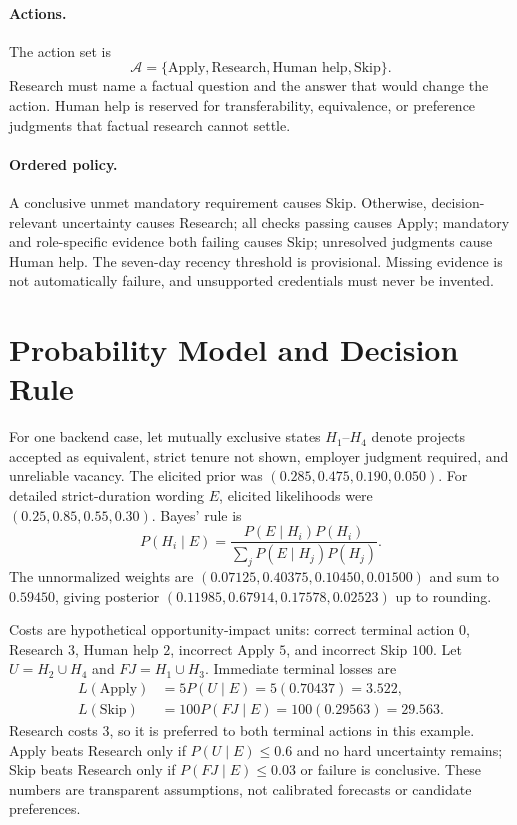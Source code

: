 \documentclass{article}
\begin{document}
\paragraph{Actions.} The action set is
\begin{equation}
\mathcal{A}=\{\text{Apply},\text{Research},\text{Human help},\text{Skip}\}.
\end{equation}
Research must name a factual question and the answer that would change the action. Human help is reserved for transferability, equivalence, or preference judgments that factual research cannot settle.

\paragraph{Ordered policy.} A conclusive unmet mandatory requirement causes Skip. Otherwise, decision-relevant uncertainty causes Research; all checks passing causes Apply; mandatory and role-specific evidence both failing causes Skip; unresolved judgments cause Human help. The seven-day recency threshold is provisional. Missing evidence is not automatically failure, and unsupported credentials must never be invented.

\section{Probability Model and Decision Rule}\label{sec:probability}
For one backend case, let mutually exclusive states $H_1$--$H_4$ denote projects accepted as equivalent, strict tenure not shown, employer judgment required, and unreliable vacancy. The elicited prior was $(0.285,0.475,0.190,0.050)$. For detailed strict-duration wording $E$, elicited likelihoods were $(0.25,0.85,0.55,0.30)$. Bayes' rule is
\begin{equation}
P(H_i\mid E)=\frac{P(E\mid H_i)P(H_i)}{\sum_jP(E\mid H_j)P(H_j)}.
\end{equation}
The unnormalized weights are $(0.07125,0.40375,0.10450,0.01500)$ and sum to $0.59450$, giving posterior $(0.11985,0.67914,0.17578,0.02523)$ up to rounding.

Costs are hypothetical opportunity-impact units: correct terminal action $0$, Research $3$, Human help $2$, incorrect Apply $5$, and incorrect Skip $100$. Let $U=H_2\cup H_4$ and $FJ=H_1\cup H_3$. Immediate terminal losses are
\begin{align}
L(\text{Apply})&=5P(U\mid E)=5(0.70437)=3.522,\\
L(\text{Skip})&=100P(FJ\mid E)=100(0.29563)=29.563.
\end{align}
Research costs $3$, so it is preferred to both terminal actions in this example. Apply beats Research only if $P(U\mid E)\leq0.6$ and no hard uncertainty remains; Skip beats Research only if $P(FJ\mid E)\leq0.03$ or failure is conclusive. These numbers are transparent assumptions, not calibrated forecasts or candidate preferences.
\end{document}
